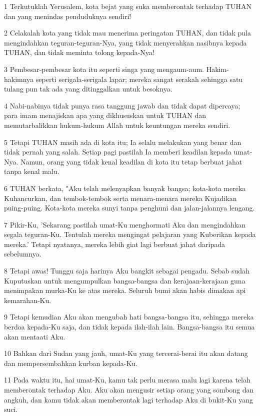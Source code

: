 \par 1 Terkutuklah Yerusalem, kota bejat yang suka memberontak terhadap TUHAN dan yang menindas penduduknya sendiri!
\par 2 Celakalah kota yang tidak mau menerima peringatan TUHAN, dan tidak pula mengindahkan teguran-teguran-Nya, yang tidak menyerahkan nasibnya kepada TUHAN, dan tidak meminta tolong kepada-Nya!
\par 3 Pembesar-pembesar kota itu seperti singa yang mengaum-aum. Hakim-hakimnya seperti serigala-serigala lapar; mereka sangat serakah sehingga satu tulang pun tak ada yang ditinggalkan untuk besoknya.
\par 4 Nabi-nabinya tidak punya rasa tanggung jawab dan tidak dapat dipercaya; para imam menajiskan apa yang dikhususkan untuk TUHAN dan memutarbalikkan hukum-hukum Allah untuk keuntungan mereka sendiri.
\par 5 Tetapi TUHAN masih ada di kota itu; Ia selalu melakukan yang benar dan tidak pernah yang salah. Setiap pagi pastilah Ia memberi keadilan kepada umat-Nya. Namun, orang yang tidak kenal keadilan di kota itu tetap berbuat jahat tanpa kenal malu.
\par 6 TUHAN berkata, "Aku telah melenyapkan banyak bangsa; kota-kota mereka Kuhancurkan, dan tembok-tembok serta menara-menara mereka Kujadikan puing-puing. Kota-kota mereka sunyi tanpa penghuni dan jalan-jalannya lengang.
\par 7 Pikir-Ku, 'Sekarang pastilah umat-Ku menghormati Aku dan mengindahkan segala teguran-Ku. Tentulah mereka mengingat pelajaran yang Kuberikan kepada mereka.' Tetapi nyatanya, mereka lebih giat lagi berbuat jahat daripada sebelumnya.
\par 8 Tetapi awas! Tunggu saja harinya Aku bangkit sebagai pengadu. Sebab sudah Kuputuskan untuk mengumpulkan bangsa-bangsa dan kerajaan-kerajaan guna menimpakan murka-Ku ke atas mereka. Seluruh bumi akan habis dimakan api kemarahan-Ku.
\par 9 Tetapi kemudian Aku akan mengubah hati bangsa-bangsa itu, sehingga mereka berdoa kepada-Ku saja, dan tidak kepada ilah-ilah lain. Bangsa-bangsa itu semua akan mentaati Aku.
\par 10 Bahkan dari Sudan yang jauh, umat-Ku yang tercerai-berai itu akan datang dan mempersembahkan kurban kepada-Ku.
\par 11 Pada waktu itu, hai umat-Ku, kamu tak perlu merasa malu lagi karena telah memberontak terhadap Aku. Aku akan mengusir setiap orang yang sombong dan angkuh, dan kamu tidak akan memberontak lagi terhadap Aku di bukit-Ku yang suci.

